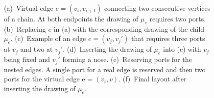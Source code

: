 \documentclass[a4paper,twoside,11pt]{article}
\begin{document}
\begin{description}
\begin{figure}[t]
    \centering
     \begin{minipage}[b]{.16\textwidth}
        \centering
    \end{minipage}
    \begin{minipage}[b]{.16\textwidth}
        \centering
    \end{minipage}
    \begin{minipage}[b]{.16\textwidth}
        \centering
    \end{minipage}
    \begin{minipage}[b]{.16\textwidth}
        \centering
    \end{minipage}
    \begin{minipage}[b]{.16\textwidth}
        \centering
    \end{minipage}
    \begin{minipage}[b]{.16\textwidth}
        \centering
    \end{minipage}
    \caption{
    (a)~Virtual edge $e = (v_{i}, v_{i+1})$ connecting two consecutive vertices of a chain. At both endpoints the drawing of $\mu_e$ requires two ports.
    (b)~Replacing $e$ in (a) with the corresponding drawing of the child $\mu_e$.
    (c)~Example of an edge $e = (v_{j},v_{j}')$ that requires three ports at $v_{j}$ and two at  $v_{j}'$.
    (d)~Inserting the drawing of $\mu_e$ into (c) with $v_{j}$ being fixed and $v_{j}'$ forming a nose.
    (e)~Reserving ports for the nested edges. A single port for a real edge is reserved and then two ports for the virtual edge e = $(v_i, v)$.
    (f)~Final layout after inserting the drawing of $\mu_e$.}
    \label{fig:5p_bicon_R}
\end{figure}


\end{description}
\end{document}
